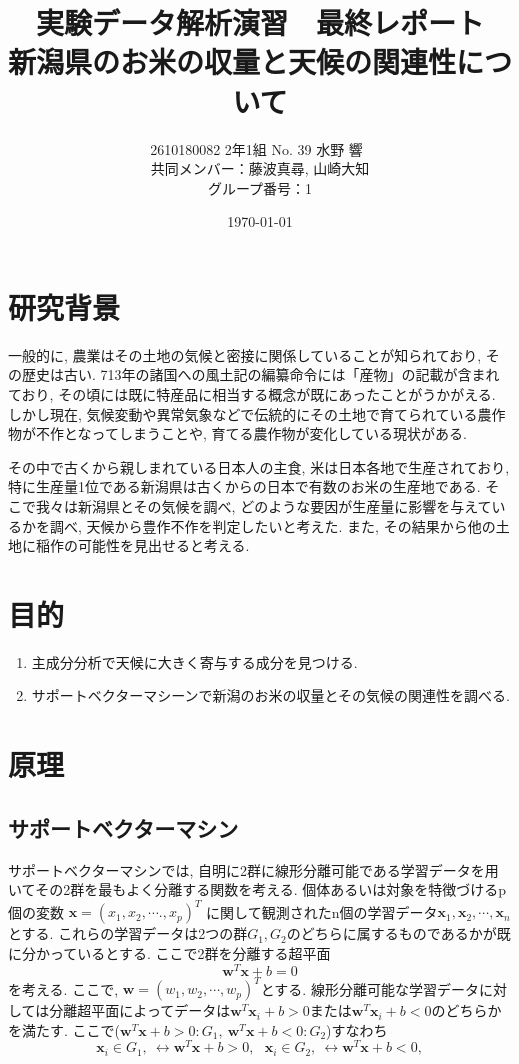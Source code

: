 \documentclass{jarticle}
\title{実験データ解析演習　最終レポート\\ 新潟県のお米の収量と天候の関連性について}
\author{2610180082 2年1組 No. 39  水野 響\ \\ 共同メンバー：藤波真尋, 山崎大知\\グループ番号：1}
\date{\today}
\begin{document}
\maketitle
\tableofcontents%
\newpage


\section{研究背景}
一般的に, 農業はその土地の気候と密接に関係していることが知られており, その歴史は古い. 713年の諸国への風土記の編纂命令には「産物」の記載が含まれており, その頃には既に特産品に相当する概念が既にあったことがうかがえる. しかし現在, 気候変動や異常気象などで伝統的にその土地で育てられている農作物が不作となってしまうことや, 育てる農作物が変化している現状がある.

その中で古くから親しまれている日本人の主食, 米は日本各地で生産されており, 特に生産量1位である新潟県は古くからの日本で有数のお米の生産地である. そこで我々は新潟県とその気候を調べ, どのような要因が生産量に影響を与えているかを調べ, 天候から豊作不作を判定したいと考えた. また, その結果から他の土地に稲作の可能性を見出せると考える.

\hypertarget{header-n2003}{%
\section{目的}\label{header-n2003}}

\begin{enumerate}
\item 主成分分析で天候に大きく寄与する成分を見つける.
\item サポートベクターマシーンで新潟のお米の収量とその気候の関連性を調べる.
\end{enumerate}


\hypertarget{header-n2005}{%
\section{原理}\label{header-n2005}}


\hypertarget{header-n2009}{%
\subsection{サポートベクターマシン}\label{header-n2009}}

サポートベクターマシンでは,
自明に2群に線形分離可能である学習データを用いてその2群を最もよく分離する関数を考える.
個体あるいは対象を特徴づけるp個の変数
\(\bm{x} = (x_1, x_2, \cdots., x_p)^T\) に関して観測されたn個の学習データ$\bm{x}_1,\bm{x}_2,\cdots,\bm{x}_n$とする.
これらの学習データは2つの群$G_1, G_2$のどちらに属するものであるかが既に分かっているとする. 
ここで2群を分離する超平面
\[\bm{w}^T\bm{x} + b = 0\]
を考える. ここで, $\bm{w} = (w_1, w_2, \cdots, w_p)^T$とする.
線形分離可能な学習データに対しては分離超平面によってデータは$\bm{w}^T\bm{x}_i + b  > 0$または$\bm{w}^T\bm{x}_i + b < 0$のどちらかを満たす.
ここで($ \bm{w}^T\bm{x} + b > 0 : G_1,\ \bm{w}^T\bm{x} + b < 0 : G_2$)すなわち
\[\bm{x}_i \in G_1,\ \leftrightarrow  \bm{w}^T\bm{x} + b > 0,\ \ \ \bm{x}_i \in G_2,\ \leftrightarrow  \bm{w}^T\bm{x} + b < 0,\]
\end{document}
